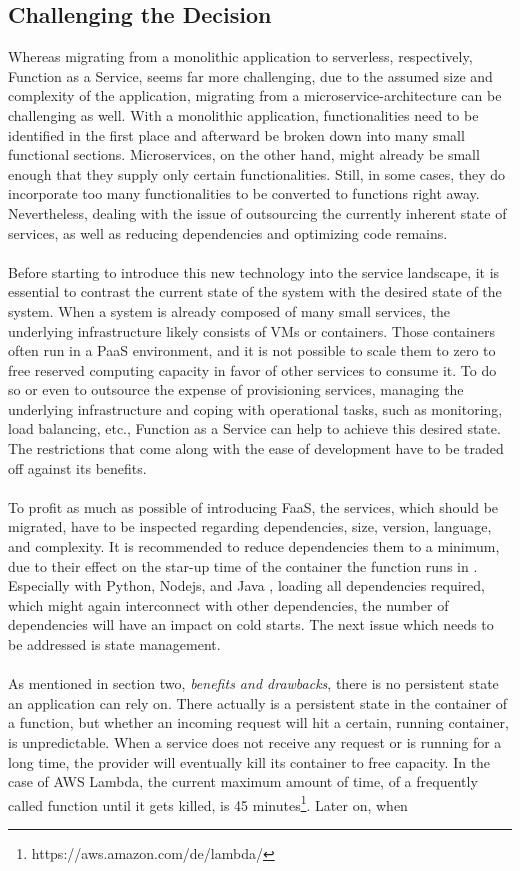 \documentclass[11pt]{article}
\begin{document}
\subsection{Challenging the Decision}
Whereas migrating from a monolithic application to serverless, respectively, Function as a Service, seems far more challenging, due to the assumed size and complexity of the application, migrating from a microservice-architecture can be challenging as well. With a monolithic application, functionalities need to be identified in the first place and afterward be broken down into many small functional sections. Microservices, on the other hand, might already be small enough that they supply only certain functionalities. Still, in some cases, they do incorporate too many functionalities to be converted to functions right away. Nevertheless, dealing with the issue of outsourcing the currently inherent state of services, as well as reducing dependencies and optimizing code remains.\\\\ Before starting to introduce this new technology into the service landscape, it is essential to contrast the current state of the system with the desired state of the system. When a system is already composed of many small services, the underlying infrastructure likely consists of VMs or containers. Those containers often run in a PaaS environment, and it is not possible to scale them to zero to free reserved computing capacity in favor of other services to consume it. To do so or even to outsource the expense of provisioning services, managing the underlying infrastructure and coping with operational tasks, such as monitoring, load balancing, etc., Function as a Service can help to achieve this desired state. The restrictions that come along with the ease of development have to be traded off against its benefits.\\\\ To profit as much as possible of introducing FaaS, the services, which should be migrated, have to be inspected regarding dependencies, size, version, language, and complexity. It is recommended to reduce dependencies them to a minimum, due to their effect on the star-up time of the container the function runs in \cite{manner2018cold}. Especially with Python, Nodejs, and Java \cite{puripunpinyo2017effect}, loading all dependencies required, which might again interconnect with other dependencies, the number of dependencies will have an impact on cold starts. The next issue which needs to be addressed is state management.\\\\ As mentioned in section two, \textit{benefits and drawbacks}, there is no persistent state an application can rely on. There actually is a persistent state in the container of a function, but whether an incoming request will hit a certain, running container, is unpredictable. When a service does not receive any request or is running for a long time, the provider will eventually kill its container to free capacity. In the case of AWS Lambda, the current maximum amount of time, of a frequently called function until it gets killed, is 45 minutes\footnote{https://aws.amazon.com/de/lambda/}. Later on, when 
\end{document}
